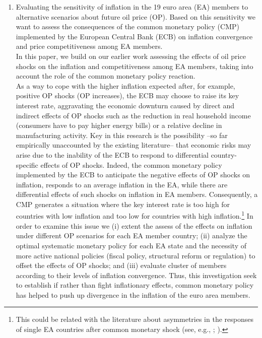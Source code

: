 \documentclass{article}\usepackage[]{graphicx}\usepackage[]{color}
\begin{document}
\begin{enumerate}
  \item Evaluating the sensitivity of inflation in the 19 euro area (EA) members to alternative scenarios about future oil price (OP). Based on this sensitivity we want to assess the consequences of the common monetary policy (CMP) implemented by the European Central Bank (ECB) on inflation convergence and price competitiveness among EA members.\\
  In this paper, we build on our earlier work \citep{Castro2016} assessing the effects of oil price shocks on the inflation and competitiveness among EA members, taking into account the role of the common monetary policy reaction.\\
  As a way to cope with the higher inflation expected after, for example, positive OP shocks (OP increases), the ECB may choose to raise its key interest rate, aggravating the economic downturn caused by direct and indirect effects of OP shocks such as the reduction in real household income (consumers have to pay higher energy bills) or a relative decline in manufacturing activity. Key in this research is the possibility –so far empirically unaccounted by the existing literature– that economic risks may arise due to the inability of the ECB to respond to differential country-specific effects of OP shocks. Indeed, the common monetary policy implemented by the ECB to anticipate the negative effects of OP shocks on inflation, responds to an average inflation in the EA, while there are differential effects of such shocks on inflation in EA members. Consequently, a CMP generates a situation where the key interest rate is too high for countries with low inflation and too low for countries with high inflation.\footnote{This could be related with the literature about asymmetries in the responses of single EA countries after common monetary shock (see, e.g., \citealp{Barigozzi2014}; \citealp{Cavallo2015}).}
  In order to examine this issue we (i) extent the assess of the effects on inflation under different OP scenarios for each EA member country; (ii) analyze the optimal systematic monetary policy for each EA state and the necessity of more active national policies (fiscal policy, structural reform or regulation) to offset the effects of OP shocks; and (iii) evaluate cluster of members according to their levels of inflation convergence.
  Thus, this investigation seek to establish if rather than fight inflationary effects, common monetary policy has helped to push up divergence in the inflation of the euro area members.
\end{enumerate}



\end{document}
